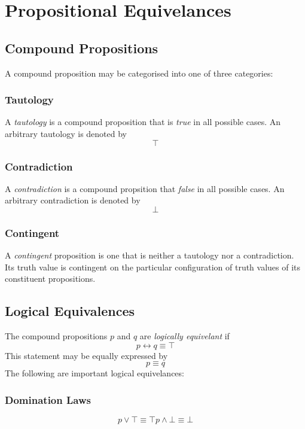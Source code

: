 \documentclass[twocolumn]{report}
\begin{document}
\section{Propositional Equivelances}
\subsection{Compound Propositions}
A compound proposition may be categorised into one of three categories:
\subsubsection{Tautology}
A \textit{tautology} is a compound proposition that is \textit{true} in all possible cases. 
An arbitrary tautology is denoted by 
\[
	\top
\]
\subsubsection{Contradiction}
A \textit{contradiction} is a compound propsition that \textit{false} in all possible cases.
An arbitrary contradiction is denoted by
\[
	\bot
\]
\subsubsection{Contingent}
A \textit{contingent} proposition is one that is neither a tautology nor a contradiction. 
Its truth value is contingent on the particular configuration of truth values of its constituent propositions.

\subsection{Logical Equivalences}
The compound propositions $p$ and $q$ are \textit{logically equivelant} if 
\begin{equation}
	p \leftrightarrow q \equiv \top
	\label{eqn: logical-equivelance}
\end{equation}
This statement may be equally expressed by 
\[
	p \equiv q
\]
The following are important logical equivelances:
\subsubsection{Domination Laws}
\begin{subequations}
	\begin{equation}
		p \lor \top \equiv \top
		\label{eqn: disjunction-domination-law}
	\end{equation}
	\begin{equation}
		p \wedge \bot \equiv \bot
		\label{eqn: conjunction-domination-law}
	\end{equation}
\end{subequations}
\end{document}
